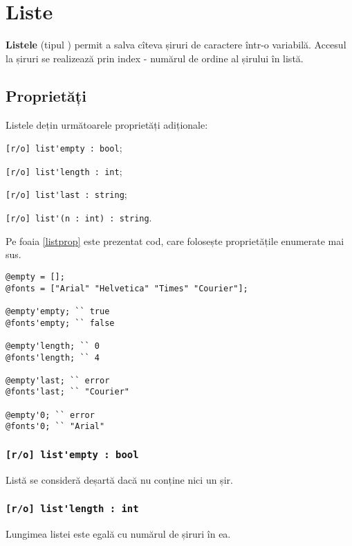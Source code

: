 \section{Liste}

{\bf Listele} (tipul ) permit a salva cîteva șiruri de caractere într-o variabilă. Accesul la șiruri se realizează prin index - numărul de ordine al șirului în listă.

\subsection{Proprietăți}

Listele dețin următoarele proprietăți adiționale:
\begin{icItems}
\item
	\lstinline|[r/o] list'empty : bool|;
\item
	\lstinline|[r/o] list'length : int|;
\item
	\lstinline|[r/o] list'last : string|;
\item
	\lstinline|[r/o] list'(n : int) : string|.
\end{icItems}

Pe foaia \ref{listprop} este prezentat cod, care folosește proprietățile enumerate mai sus.

\begin{lstlisting}[caption=Proprietățile clasei list, label=listprop]
@empty = [];
@fonts = ["Arial" "Helvetica" "Times" "Courier"];

@empty'empty; `` true
@fonts'empty; `` false

@empty'length; `` 0
@fonts'length; `` 4

@empty'last; `` error
@fonts'last; `` "Courier"

@empty'0; `` error
@fonts'0; `` "Arial"
\end{lstlisting}

\subsubsection{\lstinline|[r/o] list'empty : bool|}

Listă se consideră deșartă dacă nu conține nici un șir.

\subsubsection{\lstinline|[r/o] list'length : int|}

Lungimea listei este egală cu numărul de șiruri în ea.

